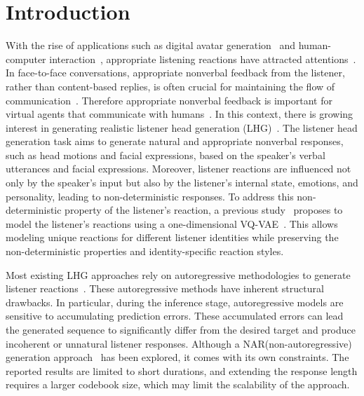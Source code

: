 \section{Introduction}
With the rise of applications such as digital avatar generation~\cite{chen2021high,li2021ai,zhang2022motiondiffuse} and human-computer interaction~\cite{zhang2021flow,guo2021ad,peng2023emotalk}, 
appropriate listening reactions have attracted attentions~\cite{tolzin2023mechanisms,cho2022alexa}.
In face-to-face conversations, appropriate nonverbal feedback from the listener, rather than content-based replies, is often crucial for maintaining the flow of communication~\cite{cassell1999power}. 
Therefore appropriate nonverbal feedback is important for virtual agents that communicate with humans~\cite{tronick1980monadic}.
In this context, there is growing interest in generating realistic listener head generation (LHG)~\cite{ng2022learning,ng2023can,song2023emotional}.
The listener head generation task aims to generate natural and appropriate nonverbal responses, such as head motions and facial expressions, based on the speaker's verbal utterances and facial expressions.
Moreover, listener reactions are influenced not only by the speaker's input but also by the listener's internal state, emotions, and personality, leading to non-deterministic responses.
To address this non-deterministic property of the listener's reaction, a previous study~\cite{ng2022learning} proposes to model the listener's reactions using a one-dimensional VQ-VAE~\cite{van2017neural}. 
This allows modeling unique reactions for different listener identities while preserving the non-deterministic properties and identity-specific reaction styles.

Most existing LHG approaches rely on autoregressive methodologies to generate listener reactions~\cite{ng2022learning,ng2023can,zhou2022responsive}.
These autoregressive methods have inherent structural drawbacks. In particular, during the inference stage, autoregressive models are sensitive to accumulating prediction errors. 
These accumulated errors can lead the generated sequence to significantly differ from the desired target and produce incoherent or unnatural listener responses.
Although a NAR(non-autoregressive) generation approach~\cite{song2023emotional} has been explored, it comes with its own constraints. The reported results are limited to short durations, and extending the response length requires a larger codebook size, which may limit the scalability of the approach.

